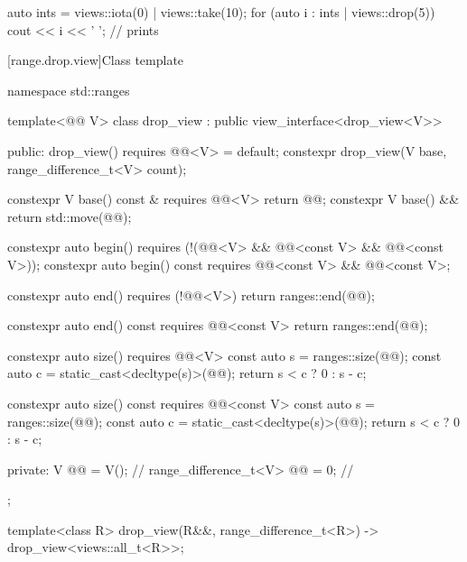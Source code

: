 \pnum
\begin{example}
\begin{codeblock}
auto ints = views::iota(0) | views::take(10);
for (auto i : ints | views::drop(5)) {
  cout << i << ' ';                             // prints 
}
\end{codeblock}
\end{example}

[range.drop.view]{Class template }

%
%
%
%
\begin{codeblock}
namespace std::ranges {
  template<@@ V>
  class drop_view : public view_interface<drop_view<V>> {
  public:
    drop_view() requires @@<V> = default;
    constexpr drop_view(V base, range_difference_t<V> count);

    constexpr V base() const & requires @@<V> { return @@; }
    constexpr V base() && { return std::move(@@); }

    constexpr auto begin()
      requires (!(@@<V> &&
                  @@<const V> && @@<const V>));
    constexpr auto begin() const
      requires @@<const V> && @@<const V>;

    constexpr auto end() requires (!@@<V>)
    { return ranges::end(@@); }

    constexpr auto end() const requires @@<const V>
    { return ranges::end(@@); }

    constexpr auto size() requires @@<V> {
      const auto s = ranges::size(@@);
      const auto c = static_cast<decltype(s)>(@@);
      return s < c ? 0 : s - c;
    }

    constexpr auto size() const requires @@<const V> {
      const auto s = ranges::size(@@);
      const auto c = static_cast<decltype(s)>(@@);
      return s < c ? 0 : s - c;
    }

  private:
    V @@ = V();                              // \expos
    range_difference_t<V> @@ = 0;           // \expos
  };

  template<class R>
    drop_view(R&&, range_difference_t<R>) -> drop_view<views::all_t<R>>;
}
\end{codeblock}

